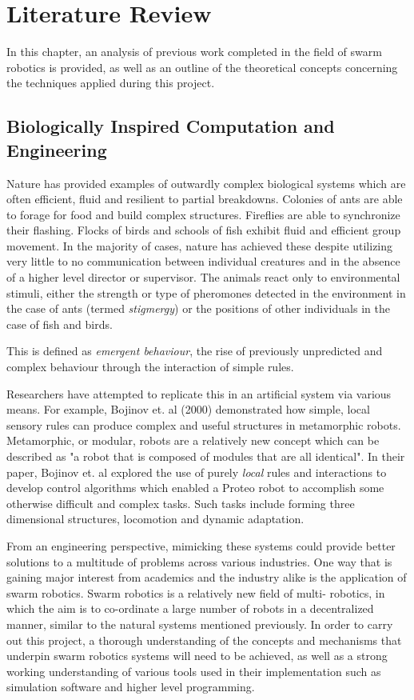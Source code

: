 \chapter{Literature Review}
\label{chap:LiteratureReview}

In this chapter, an analysis of previous work completed in the field of swarm robotics is provided, as well as an outline of the theoretical concepts concerning the techniques applied during this project.

\section{Biologically Inspired Computation and Engineering}

Nature has provided examples of outwardly complex biological systems which are often efficient, fluid
and resilient to partial breakdowns. Colonies of ants are able to forage for food and build complex
structures. Fireflies are able to synchronize their flashing. Flocks of birds and schools of fish exhibit fluid
and efficient group movement. In the majority of cases, nature has achieved these despite utilizing very little to
no communication between individual creatures and in the absence of a higher level director or supervisor.
The animals react only to environmental stimuli, either the strength or type of pheromones detected in the environment in the case of
ants (termed \textsl{stigmergy}) or the positions of other individuals in the case of fish and birds.

This is defined as \textsl{emergent behaviour}, the rise of previously unpredicted and complex behaviour through the interaction of simple rules.

Researchers have attempted to replicate this in an artificial system via various means. For example, Bojinov et. al (2000) demonstrated how simple, local sensory rules can produce complex and useful structures in metamorphic robots. \cite{Bojinov2000}  Metamorphic, or modular, robots are a relatively new concept which can be described as "a robot that is composed of modules that are all identical". \cite{Yim} In their paper, Bojinov et. al explored the use of purely \textit{local} rules and interactions to develop control algorithms which enabled a Proteo robot to accomplish some otherwise difficult and complex tasks. Such tasks include forming three dimensional structures, locomotion and dynamic adaptation.

From an engineering perspective, mimicking these systems could provide better solutions to a multitude
of problems across various industries. One way that is gaining major interest from academics and the
industry alike is the application of swarm robotics. Swarm robotics is a relatively new field of multi-
robotics, in which the aim is to co-ordinate a large number of robots in a decentralized manner, similar to
the natural systems mentioned previously. In order to carry out this project, a thorough understanding of
the concepts and mechanisms that underpin swarm robotics systems will need to be achieved, as well as
a strong working understanding of various tools used in their implementation such as simulation software
and higher level programming.

